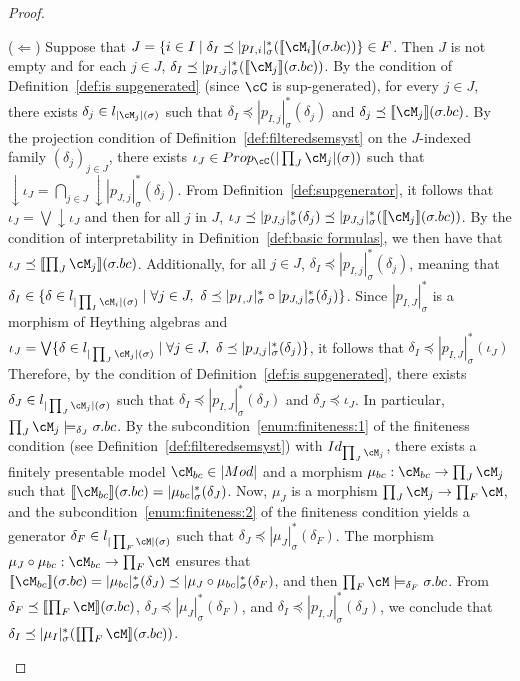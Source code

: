 \documentclass[preprint,3p,times]{elsarticle}
\def\sem#1{[\![ #1 ] \!]}
\newcommand{\set}[1]{\{#1\}}                                %
\begin{document}
\begin{proof}
\begin{itemize}
        \medskip
        ($\Leftarrow$) Suppose that $J = \{i \in I \mid \delta_I \preceq |p_{I,i}|^*_\sigma(\sem{\cM_i}(\sigma.bc))\} \in F$. Then \(J\) is not empty and for each \(j\in J\), \(\delta_I \preceq |p_{I,j}|^*_\sigma(\sem{\cM_j}(\sigma.bc))\).
        By the condition of Definition~\ref{def:is supgenerated} (since \(\cC\) is sup-generated), for every $j \in J$, there exists $\delta_j \in l_{|\cM_j|(\sigma)}$  such that $\delta_I \preceq |p_{I,j}|^*_\sigma(\delta_j)$ and \(\delta_j \preceq \sem{\cM_j}(\sigma.bc)\).
        By the projection condition of Definition~\ref{def:filteredsemsyst} on the \(J\)-indexed family \((\delta_j)_{j \in J}\), there exists \(\iota_J \in Prop_\cC(|\prod_J \cM_j|(\sigma))\) such that \(\downarrow\!\iota_J = \bigcap_{j \in J} \downarrow\!|p_{J,j}|^*_\sigma(\delta_j)\).
        From Definition~\ref{def:supgenerator}, it follows that \(\iota_J = \bigvee\!\downarrow\!\iota_J\) and then for all \(j\) in \(J\), \(\iota_J \preceq |p_{J,j}|^*_\sigma(\delta_j) \preceq |p_{J,j}|^*_\sigma(\sem{\cM_j}(\sigma.bc))\).
        By the condition of interpretability in Definition~\ref{def:basic formulas}, we then have that $\iota_J \preceq \sem{\prod_J \cM_j}(\sigma.bc)$. 
        Additionally, for all \(j \in J\), \(\delta_I \preceq |p_{I,j}|^*_\sigma(\delta_j)\), meaning that \(\delta_I \in \set{\delta \in l_{|\prod_I \cM_i|(\sigma)} \mid \forall j \in J,~ \delta \preceq |p_{I,J}|^*_\sigma \circ |p_{J,j}|^*_\sigma (\delta_j)}\).
        Since \(|p_{I,J}|^*_\sigma\) is a morphism of Heything algebras and \(\iota_J = \bigvee \set{\delta \in l_{|\prod_J \cM_j|(\sigma)} \mid \forall j \in J,~ \delta \preceq |p_{J,j}|^*_\sigma (\delta_j)}\), it follows that \(\delta_I \preceq |p_{I,J}|^*_\sigma(\iota_J)\)
        Therefore, by the condition of Definition~\ref{def:is supgenerated}, there exists $\delta_J \in l_{|\prod_J \cM_j|(\sigma)}$ such that $\delta_I \preceq |p_{I,J}|^*_\sigma(\delta_J)$ and $\delta_J \preceq \iota_J$. In particular, \(\prod_J \cM_j \models_{\delta_J} \sigma.bc\).
        By the subcondition~\ref{enum:finiteness:1} of the finiteness condition (see Definition~\ref{def:filteredsemsyst}) with \(Id_{ \prod_J \cM_j}\), there exists a finitely presentable model $\cM_{bc} \in |Mod|$ and a morphism $\mu_{bc} : \cM_{bc} \to \prod_J \cM_j$ such that $\sem{\cM_{bc}}(\sigma.bc) = |\mu_{bc}|^*_\sigma(\delta_J)$.
        Now, \(\mu_J\) is a morphism \(\prod_J \cM_j \to \prod_F \cM\), and the subcondition~\ref{enum:finiteness:2} of the finiteness condition yields a generator $\delta_F \in l_{|\prod_F \cM|(\sigma)}$ such that $\delta_J \preceq |\mu_J|^*_\sigma(\delta_F)$.
        The morphism \(\mu_J \circ \mu_{bc} : \cM_{bc} \to \prod_F \cM\) ensures that \(\sem{\cM_{bc}}(\sigma.bc) = |\mu_{bc}|^*_\sigma(\delta_J) \preceq |\mu_J \circ \mu_{bc}|^*_\sigma(\delta_F)\), and then \(\prod_F \cM \models_{\delta_F} \sigma.bc\).
        From \(\delta_F \preceq \sem{\prod_F \cM}(\sigma.bc)\), \(\delta_J \preceq |\mu_J|^*_\sigma(\delta_F)\), and \(\delta_I \preceq |p_{I,J}|^*_\sigma(\delta_J)\), we conclude that $\delta_I \preceq |\mu_I|^*_\sigma(\sem{\prod_F \cM}(\sigma.bc))$.


\end{itemize}
\end{proof}
\end{document}
